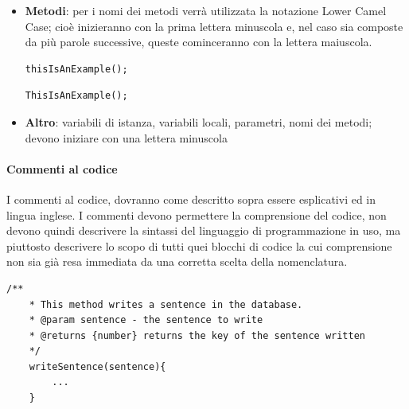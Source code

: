 \documentclass[11pt,a4paper]{article}
\begin{document}
{\begin{itemize}
		\begin{multicols}{2}
			
			\begin{lstlisting}[caption=Esempio Corretto]
			var MAXLENGTH = 100;
			\end{lstlisting}
			
			\begin{lstlisting}[caption=Esempio Scorretto]
			var MaxLenght = 100;
			\end{lstlisting}
		\end{multicols}
		
		\item \textbf{Metodi}: per i nomi dei metodi verrà utilizzata la notazione Lower Camel Case; cioè inizieranno con la prima lettera minuscola e, nel caso sia composte da più parole successive, queste cominceranno con la lettera maiuscola.
	

\begin{multicols}{2}
	
	\begin{lstlisting}[caption=Esempio Corretto]
	thisIsAnExample();
	\end{lstlisting}

	\begin{lstlisting}[caption=Esempio Scorretto]
 	ThisIsAnExample();
	\end{lstlisting}
\end{multicols}


		\item \textbf{Altro}: variabili di istanza, variabili locali, parametri, nomi dei metodi; devono iniziare con una lettera minuscola
	\end{itemize}
	
	\paragraph{Commenti al codice}
	I commenti al codice, dovranno come descritto sopra essere esplicativi ed in lingua inglese.
	I commenti devono permettere la comprensione del codice, non
	devono quindi descrivere la sintassi del linguaggio di programmazione in uso, ma piuttosto descrivere lo scopo di tutti quei blocchi di codice la cui comprensione non sia già resa immediata da una corretta scelta della nomenclatura.
	
	\begin{lstlisting}[caption=Esempio di commento ad un metodo]
	/**
	* This method writes a sentence in the database.
	* @param sentence - the sentence to write
	* @returns {number} returns the key of the sentence written
	*/
	writeSentence(sentence){
		...
	}
	

\end{lstlisting}}
\end{document}

